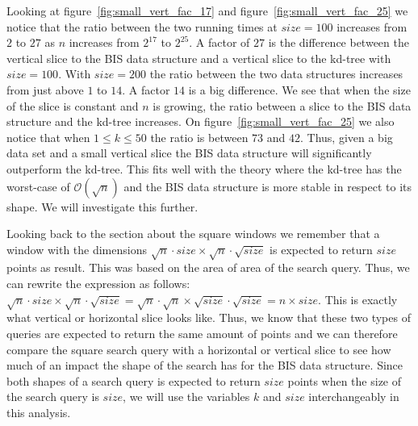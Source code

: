 Looking at figure~\ref{fig:small_vert_fac_17} and figure~\ref{fig:small_vert_fac_25} we notice that the ratio between the two running times at $size = 100$ increases from $2$ to $27$ as $n$ increases from $2^{17}$ to $2^{25}$. A factor of $27$ is the difference between the vertical slice to the BIS data structure and a vertical slice to the kd-tree with $size = 100$. With $size = 200$ the ratio between the two data structures increases from just above $1$ to $14$. A factor $14$ is a big difference. We see that when the size of the slice is constant and $n$ is growing, the ratio between a slice to the BIS data structure and the kd-tree increases. On figure~\ref{fig:small_vert_fac_25} we also notice that when $1 \leq k \leq 50$ the ratio is between $73$ and $42$. Thus, given a big data set and a small vertical slice the BIS data structure will significantly outperform the kd-tree. This fits well with the theory where the kd-tree has the worst-case of $\mathcal{O}(\sqrt{n})$ and the BIS data structure is more stable in respect to its shape. We will investigate this further.

Looking back to the section about the square windows we remember that a window with the dimensions $\sqrt{n}\cdot{size} \times \sqrt{n}\cdot\sqrt{size}$ is expected to return $size$ points as result. This was based on the area of area of the search query. Thus, we can rewrite the expression as follows: $\sqrt{n}\cdot{size} \times \sqrt{n}\cdot\sqrt{size} = \sqrt{n}\cdot\sqrt{n} \times \sqrt{size}\cdot\sqrt{size} = n \times size$. This is exactly what vertical or horizontal slice looks like. Thus, we know that these two types of queries are expected to return the same amount of points and we can therefore compare the square search query with a horizontal or vertical slice to see how much of an impact the shape of the search has for the BIS data structure. Since both shapes of a search query is expected to return $size$ points when the size of the search query is $size$, we will use the variables $k$ and $size$ interchangeably in this analysis.

